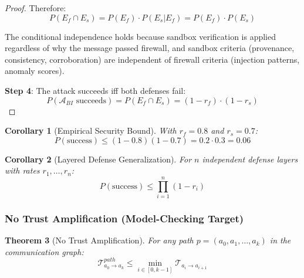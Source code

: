 \documentclass[
]{article}
\newtheorem{theorem}{Theorem}[section]
\newtheorem{corollary}[theorem]{Corollary}
\begin{document}
\begin{proof}
Therefore:
\begin{equation}
\label{eq:defense-independence}
P(E_f \cap E_s) = P(E_f) \cdot P(E_s | E_f) = P(E_f) \cdot P(E_s)
\end{equation}

The conditional independence holds because sandbox verification is applied regardless of why the message passed firewall, and sandbox criteria (provenance, consistency, corroboration) are independent of firewall criteria (injection patterns, anomaly scores).

\textbf{Step 4}: The attack succeeds iff both defenses fail:
\begin{equation}
\label{eq:attack-success-prob}
P(\mathcal{A}_{BI} \text{ succeeds}) = P(E_f \cap E_s) = (1 - r_f) \cdot (1 - r_s)
\end{equation}
\end{proof}

\begin{corollary}[Empirical Security Bound]
\label{cor:empirical-security}
With $r_f = 0.8$ and $r_s = 0.7$:
\begin{equation}
\label{eq:empirical-bound}
P(\text{success}) \leq (1 - 0.8)(1 - 0.7) = 0.2 \cdot 0.3 = 0.06
\end{equation}
\end{corollary}

\begin{corollary}[Layered Defense Generalization]
\label{cor:n-layer-bound}
For $n$ independent defense layers with rates $r_1, \ldots, r_n$:
\begin{equation}
\label{eq:n-layer-bound}
P(\text{success}) \leq \prod_{i=1}^{n} (1 - r_i)
\end{equation}
\end{corollary}

\subsubsection{No Trust Amplification (Model-Checking
Target)}\label{sec:trust-bound-proof}

\begin{theorem}[No Trust Amplification]
\label{thm:trust-bound}
For any path $p = (a_0, a_1, \ldots, a_k)$ in the communication graph:
\begin{equation}
\label{eq:trust-path-bound}
\mathcal{T}_{a_0 \to a_k}^{path} \leq \min_{i \in [0,k-1]} \mathcal{T}_{a_i \to a_{i+1}}
\end{equation}
\end{theorem}
\end{document}
